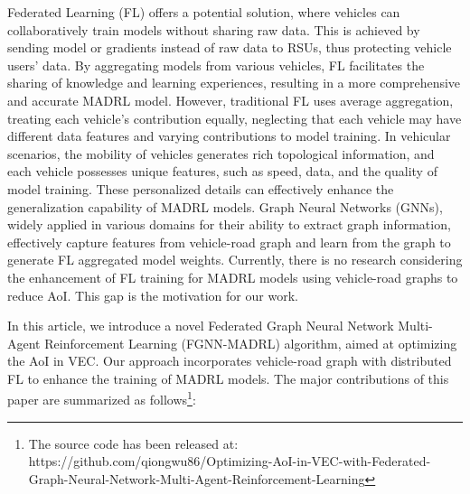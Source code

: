 \documentclass[lettersize,journal,onecolumn]{IEEEtran}
\begin{document}
Federated Learning (FL) offers a potential solution, where vehicles can collaboratively train models without sharing raw data. This is achieved by sending model or gradients instead of raw data to RSUs, thus protecting vehicle users' data\cite{ref12,ref13}. 
By aggregating models from various vehicles, FL facilitates the sharing of knowledge and learning experiences, resulting in a more comprehensive and accurate MADRL model.
However, traditional FL uses average aggregation, treating each vehicle's contribution equally, neglecting that each vehicle may have different data features and varying contributions to model training\cite{ref14,ref42,ref43}. 
In vehicular scenarios, the mobility of vehicles generates rich topological information, and each vehicle possesses unique features, such as speed, data, and the quality of model training. These personalized details can effectively enhance the generalization capability of MADRL models. 
Graph Neural Networks (GNNs), widely applied in various domains for their ability to extract graph information\cite{ref15}, effectively capture features from vehicle-road graph and learn from the graph to generate FL aggregated model weights.
Currently, there is no research considering the enhancement of FL training for MADRL models using vehicle-road graphs to reduce AoI. This gap is the motivation for our work.

In this article, we introduce a novel Federated Graph Neural Network Multi-Agent Reinforcement Learning (FGNN-MADRL) algorithm, aimed at optimizing the AoI in VEC. Our approach incorporates vehicle-road graph with distributed FL to enhance the training of MADRL models. The major contributions of this paper are summarized as follows\footnote{The source code has been released at: https://github.com/qiongwu86/Optimizing-AoI-in-VEC-with-Federated-Graph-Neural-Network-Multi-Agent-Reinforcement-Learning}:
\end{document}
